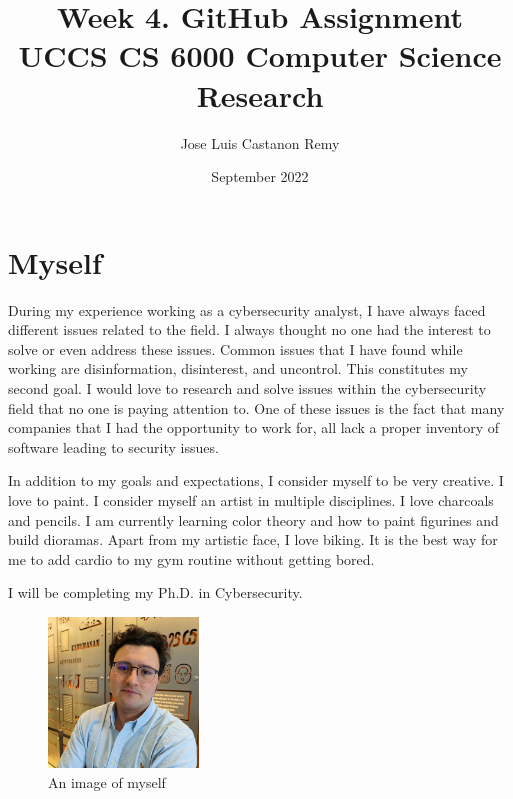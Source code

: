 
\title{Week 4. GitHub Assignment \\
\large UCCS CS 6000 Computer Science Research}
\author{Jose Luis Castanon Remy}
\date{September 2022}

%

\maketitle

\section{Myself}

During my experience working as a cybersecurity analyst, I have always faced different issues related to the field. I always thought no one had the interest to solve or even address these issues. Common issues that I have found while working are disinformation, disinterest, and uncontrol. This constitutes my second goal. I would love to research and solve issues within the cybersecurity field that no one is paying attention to. One of these issues is the fact that many companies that I had the opportunity to work for, all lack a proper inventory of software leading to security issues.



In addition to my goals and expectations, I consider myself to be very creative. I love to paint. I consider myself an artist in multiple disciplines. I love charcoals and pencils. I am currently learning color theory and how to paint figurines and build dioramas. Apart from my artistic face, I love biking. It is the best way for me to add cardio to my gym routine without getting bored.

I will be completing my Ph.D. in Cybersecurity.


\begin{figure}[htp]
    \centering
    \includegraphics[width=4cm]{UCCSProfileIMG.jpg}
    \caption{An image of myself}
    \label{fig:myself}
\end{figure}


